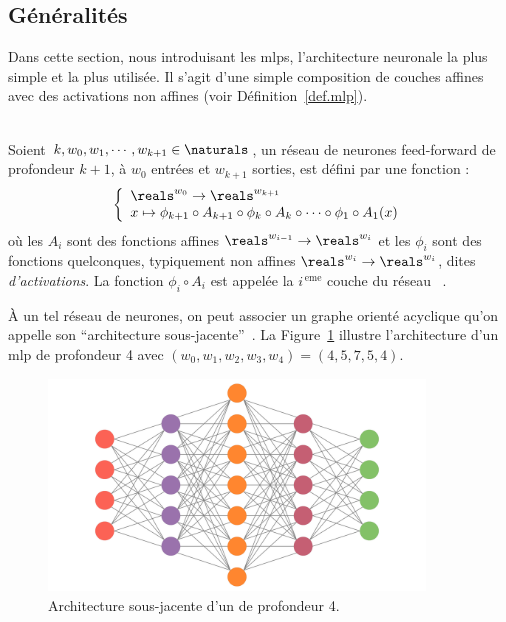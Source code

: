 \subsection{Généralités}

Dans cette section, nous introduisant les \glspl{mlp},
l'architecture neuronale la plus simple et la plus utilisée.
Il s'agit d'une simple composition de couches affines avec des activations non affines 
(voir Définition~\ref{def.mlp}).


\begin{definition}\ \\
    \label{def.mlp}
    Soient \(k, w_0, w_1, \cdots, w_{k+1}\in\naturals\), 
    un réseau de neurones feed-forward de profondeur \(k+1\), à \(w_0\) entrées et \(w_{k+1}\) sorties, 
    est défini par une fonction :
    \begin{equation}
        \label{eq.mlp}
        \left\{
        \begin{array}{l}
            \reals^{w_0} \to \reals^{w_{k+1}}\\
            x\mapsto
            \phi_{k+1} \circ A_{k+1} \circ \phi_k \circ A_k \circ \cdots \circ \phi_1 \circ A_1(x)
        \end{array}
        \right.
    \end{equation}
    où les \(A_i\) sont des fonctions affines \(\reals^{w_{i-1}}\to\reals^{w_i}\) 
    et les \(\phi_i\) sont des fonctions quelconques, typiquement non affines
    \(\reals^{w_i}\to\reals^{w_i}\), dites \emph{d'activations}.
    La fonction \(\phi_i\circ A_i\) est appelée la \(i^{\, \mathrm{eme}}\) couche du réseau%
    ~\cite{Mukherjee_2021}.
\end{definition}

À un tel réseau de neurones, on peut associer un graphe orienté acyclique 
qu'on appelle son ``architecture sous-jacente''~\cite{Kearns_Vazirani_1994}. 
La Figure~\ref{fig.mlp} illustre l'architecture d'un \gls{mlp} de profondeur 4
avec \({(w_0, w_1, w_2, w_3, w_4) = (4, 5, 7, 5, 4)}\).

\begin{figure}[hbt]
    \begin{center}
        \includegraphics[width=10cm]{assets/images/mlp.png}
    \end{center}
    \caption{Architecture sous-jacente d'un  de profondeur 4.}
    \label{fig.mlp}
\end{figure}

